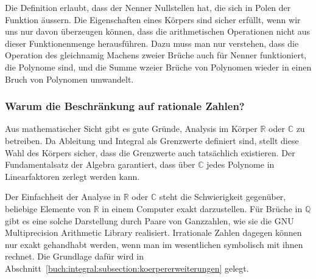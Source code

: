 Die Definition erlaubt, dass der Nenner Nullstellen hat, die sich in
Polen der Funktion äussern.
Die Eigenschaften eines Körpers sind sicher erfüllt, wenn wir uns
nur davon überzeugen können,
dass die arithmetischen Operationen nicht aus dieser Funktionenmenge
herausführen.
Dazu muss man nur verstehen, dass die Operation des gleichnamig Machens 
zweier Brüche auch für Nenner funktioniert, die Polynome sind, und die
Summe wzeier Brüche von Polynomen wieder in einen Bruch von Polynomen
umwandelt.

%
%
\subsubsection{Warum die Beschränkung auf rationale Zahlen?}
Aus mathematischer Sicht gibt es gute Gründe, Analysis im Körper $\mathbb{R}$
oder $\mathbb{C}$ zu betreiben.
Da Ableitung und Integral als Grenzwerte definiert sind, stellt diese
Wahl des Körpers sicher, dass die Grenzwerte auch tatsächlich existieren.
Der Fundamentalsatz der Algebra garantiert, dass über $\mathbb{C}$
jedes Polynome in Linearfaktoren zerlegt werden kann.

Der Einfachheit der Analyse in $\mathbb{R}$ oder $\mathbb{C}$ steht
die Schwierigkeit gegenüber, beliebige Elemente von $\mathbb{R}$ in
einem Computer exakt darzustellen.
Für Brüche in $\mathbb{Q}$ gibt es eine solche Darstellung durch
Paare von Ganzzahlen, wie sie die GNU Multiprecision Arithmetic Library
\cite{buch:gmp} realisiert.
Irrationale Zahlen dagegen können nur exakt gehandhabt werden, wenn
man im wesentlichen symbolisch mit ihnen rechnet. 
Die Grundlage dafür wird in
Abschnitt~\ref{buch:integral:subsection:koerpererweiterungen}
gelegt.



